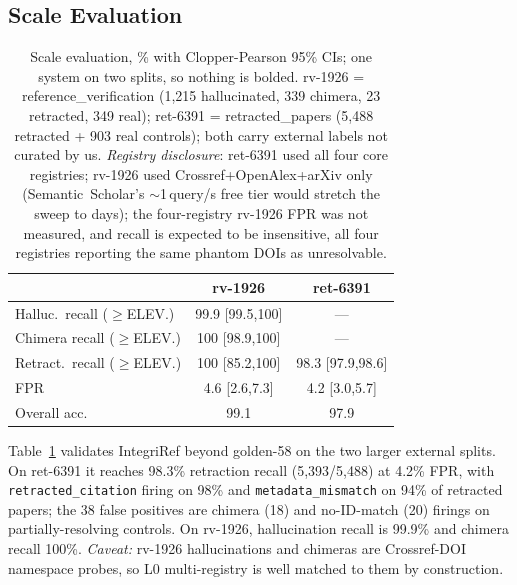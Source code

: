 \documentclass[letterpaper]{article} %
\begin{document}
\subsection{Scale Evaluation}

\begin{table}[!tb]
\centering
\small
\setlength{\tabcolsep}{4pt}
\begin{tabular}{@{}lcc@{}}
\toprule
& \textbf{rv-1926} & \textbf{ret-6391} \\
\midrule
Halluc.\ recall ($\geq$ELEV.)  & 99.9 \footnotesize{[99.5,100]}  & --- \\
Chimera recall ($\geq$ELEV.)   & 100  \footnotesize{[98.9,100]}  & --- \\
Retract.\ recall ($\geq$ELEV.) & 100  \footnotesize{[85.2,100]}  & 98.3 \footnotesize{[97.9,98.6]} \\
FPR                            & 4.6 \footnotesize{[2.6,7.3]}    & 4.2 \footnotesize{[3.0,5.7]} \\
Overall acc.                   & 99.1                            & 97.9 \\
\bottomrule
\end{tabular}
\caption{Scale evaluation, \% with Clopper-Pearson 95\% CIs; one system on two splits, so nothing is bolded. rv-1926 = reference\_verification (1{,}215 hallucinated, 339 chimera, 23 retracted, 349 real); ret-6391 = retracted\_papers (5{,}488 retracted + 903 real controls); both carry external labels not curated by us. \emph{Registry disclosure}: ret-6391 used all four core registries; rv-1926 used Crossref+OpenAlex+arXiv only (Semantic~Scholar's $\sim$1\,query/s free tier would stretch the sweep to days); the four-registry rv-1926 FPR was not measured, and recall is expected to be insensitive, all four registries reporting the same phantom DOIs as unresolvable.}
\label{tab:scale}
\end{table}

Table~\ref{tab:scale} validates IntegriRef beyond golden-58 on the two larger external splits. On ret-6391 it reaches 98.3\% retraction recall (5{,}393/5{,}488) at 4.2\% FPR, with \texttt{retracted\_citation} firing on 98\% and \texttt{metadata\_mismatch} on 94\% of retracted papers; the 38 false positives are chimera (18) and no-ID-match (20) firings on partially-resolving controls. On rv-1926, hallucination recall is 99.9\% and chimera recall 100\%. \emph{Caveat:} rv-1926 hallucinations and chimeras are Crossref-DOI namespace probes, so L0 multi-registry is well matched to them by construction.
\end{document}
